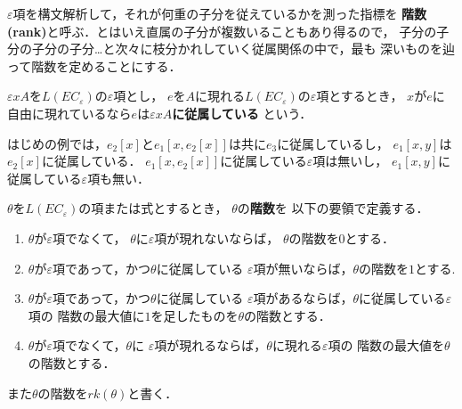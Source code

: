 	$\varepsilon$項を構文解析して，それが何重の子分を従えているかを測った指標を
	{\bf 階数}{\bf (rank)}と呼ぶ．とはいえ直属の子分が複数いることもあり得るので，
	子分の子分の子分の子分…と次々に枝分かれしていく従属関係の中で，最も
	深いものを辿って階数を定めることにする．
	
	\begin{screen}
		\begin{metadfn}[従属]
			$\varepsilon x A$を$L(EC_{\varepsilon})$の$\varepsilon$項とし，
			$e$を$A$に現れる$L(EC_{\varepsilon})$の$\varepsilon$項とするとき，
			$x$が$e$に自由に現れているなら$e$は{\bf $\varepsilon x A$に従属している}
			という．
		\end{metadfn}
	\end{screen}
	
	はじめの例では，$e_{2}[x]$と$e_{1}[x,e_{2}[x]]$は共に$e_{3}$に従属しているし，
	$e_{1}[x,y]$は$e_{2}[x]$に従属している．
	$e_{1}[x,e_{2}[x]]$に従属している$\varepsilon$項は無いし，
	$e_{1}[x,y]$に従属している$\varepsilon$項も無い．
	
	\begin{screen}
		\begin{metadfn}[階数]
			$\theta$を$L(EC_{\varepsilon})$の項または式とするとき，
			$\theta$の{\bf 階数}\index{かいすう@階数}{\bf (rank)}を
			以下の要領で定義する．
			\begin{enumerate}
				\item $\theta$が$\varepsilon$項でなくて，
					$\theta$に$\varepsilon$項が現れないならば，
					$\theta$の階数を$0$とする．
				\item $\theta$が$\varepsilon$項であって，かつ$\theta$に従属している
					$\varepsilon$項が無いならば，$\theta$の階数を$1$とする.
				\item $\theta$が$\varepsilon$項であって，かつ$\theta$に従属している
					$\varepsilon$項があるならば，$\theta$に従属している$\varepsilon$項の
					階数の最大値に$1$を足したものを$\theta$の階数とする．
				\item $\theta$が$\varepsilon$項でなくて，$\theta$に
					$\varepsilon$項が現れるならば，$\theta$に現れる$\varepsilon$項の
					階数の最大値を$\theta$の階数とする．
			\end{enumerate}
			また$\theta$の階数を$rk(\theta)$と書く．
		\end{metadfn}
	\end{screen}
	
